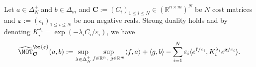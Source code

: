 \begin{prop*}
Let $a\in\Delta_N^{+}$ and $b\in\Delta_m$ and $\mathbf{C}:=(C_i)_{1\leq i\leq N}\in\left(\mathbb{R}^{n\times m}\right)^N$ be $N$ cost matrices and $\bm{\varepsilon}:=(\epsilon_i)_{1\leq i\leq N}$ be non negative reals. Strong duality holds and by denoting $K_i^{\lambda_i} =\exp\left(-\lambda_i C_{i}/\varepsilon_i\right)$, we have
\begin{align*}
\widehat{\MOT}_{\mathbf{C}}^{\bm{\varepsilon}}(a,b):=\sup_{\lambda\in\Delta_N^{+}}\sup\limits_{f\in \mathbb{R}^n,~g\in \mathbb{R}^m} \langle f, a\rangle+\langle g,b\rangle-\sum_{i=1}^N\varepsilon_i\langle e^{\mathbf{f}/\varepsilon_i},K_i^{\lambda_i} e^{\mathbf{g}/\varepsilon_i}\rangle.
\end{align*}
\end{prop*}

